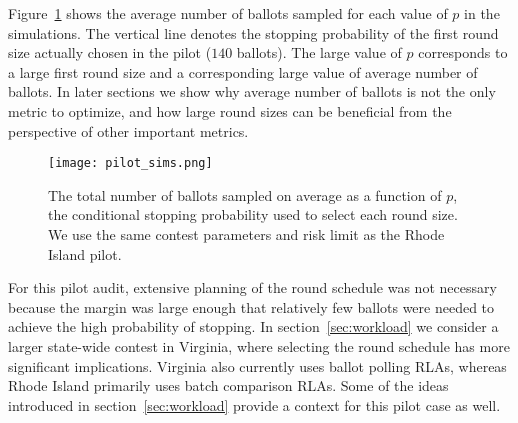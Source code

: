 Figure~\ref{fig:pilot_sims} shows the average number of ballots sampled for each value of $p$ in the simulations. The vertical line denotes the stopping probability of the first round size actually chosen in the pilot ($140$ ballots). The large value of $p$ corresponds to a large first round size and a corresponding large value of average number of ballots. In later sections we show why average number of ballots is not the only metric to optimize, and how large round sizes can be beneficial from the perspective of other important metrics. 

\begin{figure}[h!]
\texttt{[image: pilot\_sims.png]}
\caption{The total number of ballots sampled on average as a function of $p$, the conditional stopping probability used to select each round size. We use the same contest parameters and risk limit as the Rhode Island pilot.}
\label{fig:pilot_sims}
\end{figure}

For this pilot audit, extensive planning of the round schedule was not necessary because the margin was large enough that relatively few ballots were needed to achieve the high probability of stopping. In section~\ref{sec:workload} we consider a larger state-wide contest in Virginia, where selecting the round schedule has more significant implications. Virginia also currently uses ballot polling RLAs, whereas Rhode Island primarily uses batch comparison RLAs. Some of the ideas introduced in section~\ref{sec:workload} provide a context for this pilot case as well.

